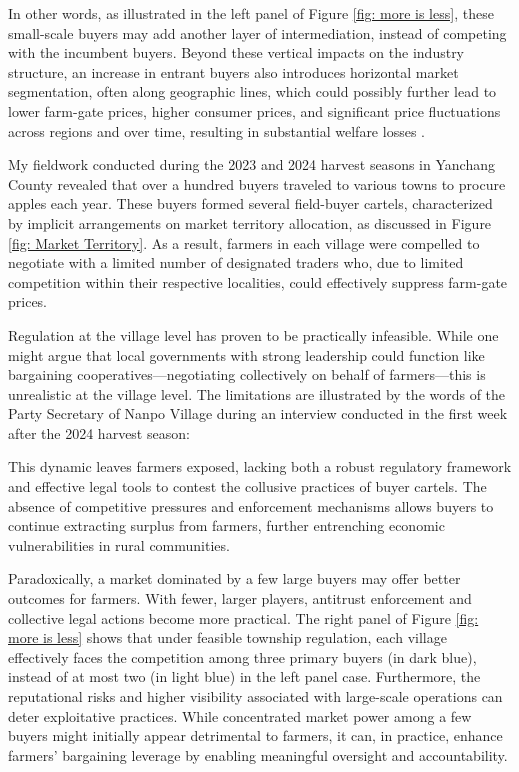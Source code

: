 In other words, as illustrated in the left panel of Figure \ref{fig: more is less}, these small-scale buyers may add another layer of intermediation, instead of competing with the incumbent buyers. Beyond these vertical impacts on the industry structure, an increase in entrant buyers also introduces horizontal market segmentation, often along geographic lines, which could possibly further lead to lower farm-gate prices, higher consumer prices, and significant price fluctuations across regions and over time, resulting in substantial welfare losses \citep{bergquist_McIntosh_2022}.


My fieldwork conducted during the 2023 and 2024 harvest seasons in Yanchang County revealed that over a hundred buyers traveled to various towns to procure apples each year. These buyers formed several field-buyer cartels, characterized by implicit arrangements on market territory allocation, as discussed in Figure \ref{fig: Market Territory}. As a result, farmers in each village were compelled to negotiate with a limited number of designated traders who, due to limited competition within their respective localities, could effectively suppress farm-gate prices.

Regulation at the village level has proven to be practically infeasible. While one might argue that local governments with strong leadership could function like bargaining cooperatives---negotiating collectively on behalf of farmers---this is unrealistic at the village level. The limitations are illustrated by the words of the Party Secretary of Nanpo Village during an interview conducted in the first week after the 2024 harvest season:

\begin{quote}  \end{quote}

This dynamic leaves farmers exposed, lacking both a robust regulatory framework and effective legal tools to contest the collusive practices of buyer cartels. The absence of competitive pressures and enforcement mechanisms allows buyers to continue extracting surplus from farmers, further entrenching economic vulnerabilities in rural communities.


Paradoxically, a market dominated by a few large buyers may offer better outcomes for farmers. With fewer, larger players, antitrust enforcement and collective legal actions become more practical. The right panel of Figure \ref{fig: more is less} shows that under feasible township regulation, each village effectively faces the competition among three primary buyers (in dark blue), instead of at most two (in light blue) in the left panel case. Furthermore, the reputational risks and higher visibility associated with large-scale operations can deter exploitative practices. While concentrated market power among a few buyers might initially appear detrimental to farmers, it can, in practice, enhance farmers' bargaining leverage by enabling meaningful oversight and accountability.

